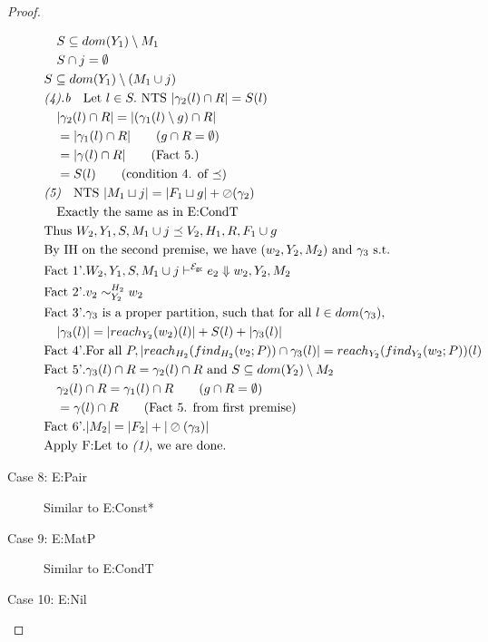 \documentclass{easychair}
\newcommand{\ms}[1]{\ensuremath{\mathsf{#1}}}
\newcommand{\veq}[4]{#3 \sim^{#1}_{#2} #4}
\newcommand{\oh}[1]{\oslash(#1)}
\newcommand{\gcSem}{\ensuremath{\mathcal{E}_{\ms{gc}}}}
\theoremstyle{definition}
\begin{document}
\begin{proof}
\begin{description}
\begin{align*}
		&\quad S \subseteq dom(Y_1) \setminus M_1\\
		&\quad S \cap j = \emptyset\\
		&S \subseteq dom(Y_1) \setminus (M_1 \cup j)\\
		&\emph{(4).b}\quad \text{Let } l \in S. \text{ NTS } |\gamma_2(l) \cap R| = S(l)\\
		&\quad |\gamma_2(l) \cap R| = |(\gamma_1(l) \setminus g) \cap R| \\
		&\quad = |\gamma_1(l) \cap R| \tag{$g \cap R = \emptyset$}\\
		&\quad = |\gamma(l) \cap R| \tag{Fact 5.}\\
		&\quad = S(l) \tag{condition 4. of $\preceq$}\\ 
		&\emph{(5)}\quad \text{NTS } |M_1 \sqcup j| = |F_1 \sqcup g| + \oh{\gamma_2}\\
		&\quad\text{Exactly the same as in E:CondT}\\
		&\text{Thus } W_2,Y_1,S,M_1 \cup j \preceq V_2,H_1,R, F_1 \cup g\\
		&\text{By IH on the second premise, we have } (w_2,Y_2,M_2) \text{ and } \gamma_3 \text{ s.t. }\\
		&\text{Fact 1'}. W_2,Y_1,S,M_1 \cup j \vdash^{\gcSem} e_2 \Downarrow w_2,Y_2,M_2\\
		&\text{Fact 2'}. \veq{H_2}{Y_2}{v_2}{w_2}\\
		&\text{Fact 3'}. \gamma_3 \text{ is a proper partition, such that for all } l \in dom(\gamma_3),\\
		&\quad|\gamma_3(l)| = |reach_{Y_2}(w_2)(l)| + S(l) + |\gamma_3(l)|\\
		&\text{Fact 4'}. \text{For all } P, |reach_{H_2}(find_{H_2}(v_2;P)) \cap \gamma_3(l)| = 
				reach_{Y_2}(find_{Y_2}(w_2;P))(l)\\
		&\text{Fact 5'}. \gamma_3(l) \cap R = \gamma_2(l) \cap R \text{ and } 
			S \subseteq dom(Y_2) \setminus M_2\\
		&\quad \gamma_2(l) \cap R = \gamma_1(l) \cap R \tag{$g \cap R = \emptyset$}\\
		&\quad = \gamma(l) \cap R \tag{Fact 5. from first premise}\\
		&\text{Fact 6'}. |M_2| = |F_2| + |\oh{\gamma_3}|\\
		&\text{Apply F:Let to \emph{(1)}, we are done.}
  \end{align*}
	\item[Case 8: E:Pair]
  Similar to E:Const*
  \item[Case 9: E:MatP]
  Similar to E:CondT
  \item[Case 10: E:Nil]

\end{description}
\end{proof}
\end{document}
